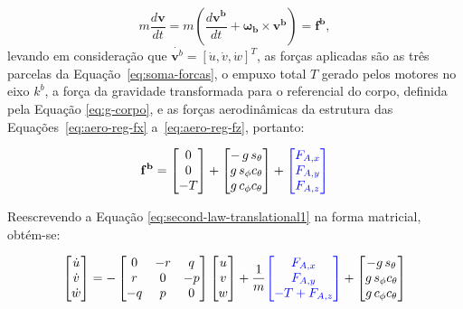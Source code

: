 \begin{equation}
  m \frac{d \mathbf{v}}{dt} = m \left( \frac{d \mathbf{v^b}}{dt} + \boldsymbol{\omega_b} \times \mathbf{v^b} \right) = \mathbf{f^b},
  \label{eq:second-law-translational1}
\end{equation}
levando em consideração que $\dot{\mathbf{v}^b}=[\dot{u}, \dot{v}, \dot{w}]^T$, {\color{blue}as forças aplicadas são as três parcelas da Equação~\eqref{eq:soma-forcas}, o empuxo total $T$ gerado pelos motores no eixo $k^b$, a força da gravidade transformada para o referencial do corpo, definida pela Equação \eqref{eq:g-corpo}, e as forças aerodinâmicas da estrutura das Equações~\eqref{eq:aero-reg-fx} a~\eqref{eq:aero-reg-fz}}, portanto:

\begin{equation}
  \mathbf{f^b} = \begin{bmatrix} 0 \\ 0 \\ -T \end{bmatrix} + \begin{bmatrix} -\,g\,s_\theta \\ g\,s_\phi c_\theta \\ g\,c_\phi c_\theta \end{bmatrix} + {\color{blue}\begin{bmatrix} F_{A,x} \\ F_{A,y} \\ F_{A,z} \end{bmatrix}}
  \label{eq:second-law-translational2}
\end{equation}

Reescrevendo a Equação \eqref{eq:second-law-translational1} na forma matricial, obtém-se:

\begin{equation}
  \begin{bmatrix} \dot{u} \\ \dot{v} \\ \dot{w} \end{bmatrix}
  = -\begin{bmatrix} 0 & -r & q \\ r & 0 & -p \\ -q & p & 0 \end{bmatrix}
  \begin{bmatrix} u \\ v \\ w \end{bmatrix}
  + \frac{1}{m}{\color{blue}\begin{bmatrix} F_{A,x} \\ F_{A,y} \\ -T + F_{A,z} \end{bmatrix}}
  + \begin{bmatrix} -g\,s_\theta \\ g\,s_\phi c_\theta \\ g\,c_\phi c_\theta \end{bmatrix}
  \label{eq:trans-matricial}
  \end{equation}

